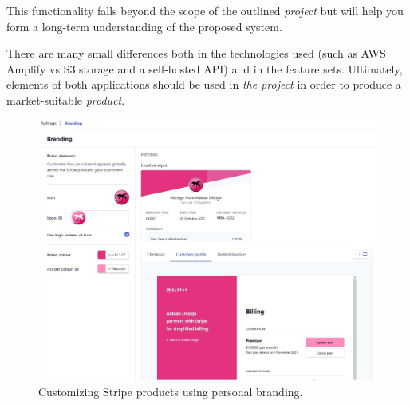 This functionality falls beyond the scope
of the outlined \textit{project} but will help you form a long-term understanding of the proposed system.
\par
There are many small differences both in the technologies used (such as AWS Amplify vs S3 storage and a self-hosted API)
and in the feature sets. Ultimately, elements of both applications should be used in 
\textit{the project} in order to produce a market-suitable \textit{product}.
\begin{figure}[H]
	\centering
	\includegraphics[width=1\linewidth]{graphics/stripe-customization.jpg}
	\caption{Customizing Stripe products using personal branding.}
	\vspace*{-5mm}
	\label{fig:stripe-customization}
\end{figure}
\pagebreak